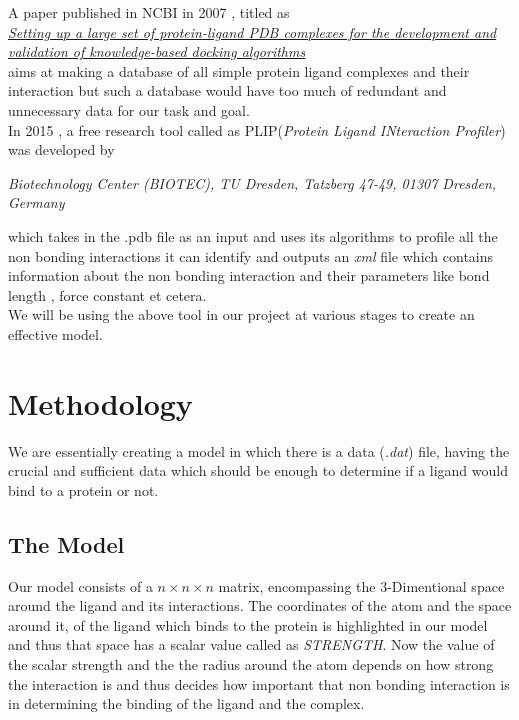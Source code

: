 \documentclass[12pt]{article}%
\begin{document}
A paper published in NCBI in 2007 , titled as \\ \href{https://www.ncbi.nlm.nih.gov/pmc/articles/PMC2008766/}{\emph{Setting up a large set of protein-ligand PDB complexes for the development and validation of knowledge-based docking algorithms}} \\ aims at making a database of all simple protein ligand complexes and their interaction but such a database would have too much of redundant and unnecessary data for our task and goal.  \\

In 2015 , a free research tool called as PLIP(\emph{Protein Ligand INteraction Profiler}) was developed by \\ \begin{center}
\emph{Biotechnology Center (BIOTEC), TU Dresden, Tatzberg 47-49, 01307 Dresden, Germany}
\end{center} 
which takes in the .pdb file as an input and uses its algorithms to profile all the non bonding interactions it can identify and outputs an \emph{xml} file which contains information about the non bonding interaction and their parameters like bond length , force constant et cetera. \\

We will be using the above tool in our project at various stages to create an effective model.

\newpage

\section{Methodology}

We are essentially creating a model in which there is a data (\emph{.dat}) file,  having the crucial and sufficient data which should be enough to determine if a ligand would bind to a protein or not.

\subsection{The Model} 
Our model consists of a $n\times n \times n$ matrix, encompassing the 3-Dimentional space around the ligand  and its interactions. The coordinates of the atom and the space around it, of the ligand which binds to the protein is highlighted in our model and thus that space has a scalar value called as \emph{STRENGTH}.
Now the value of the scalar strength and the the radius around the atom depends on how strong the interaction is and thus decides how important that non bonding interaction is in determining the binding of the ligand and the complex.
\end{document}
